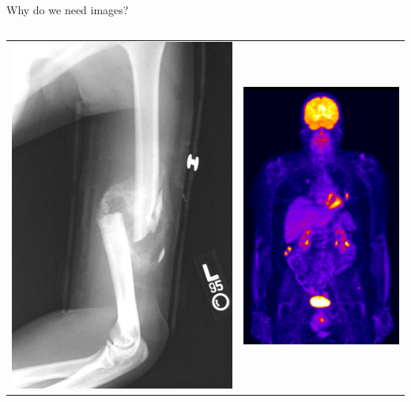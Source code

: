 \begin{frame}[c]{Why do we need images?}
\begin{columns}[c]
\begin{column}{0.5\textwidth}
\begin{tabular}{cc}
				\includegraphics[width=.45\textwidth, trim={0,  6cm, 0, 6cm},clip]{images/Communitive_midshaft_humeral_fracture_callus.jpg} &
				\includegraphics[width=.45\textwidth,trim={0,  4.7cm, 0, 0},clip]{images/appB.png}%
			\end{tabular}
		\end{column}
	\end{columns}

\end{frame}

